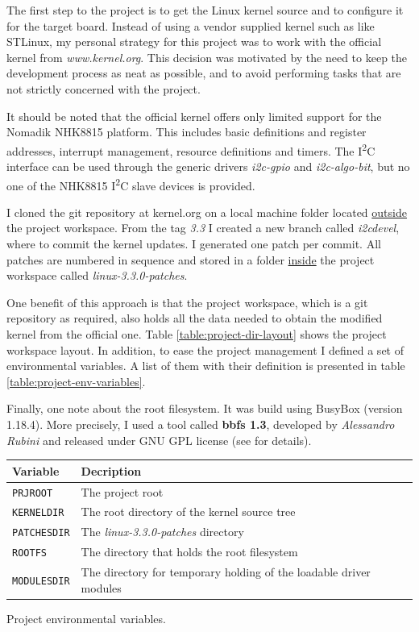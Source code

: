 \documentclass[a4paper,10pt]{article}
\makeatletter
\newenvironment{tablehere}{\def\@captype{table}}{}
\newcommand{\icc}{I\textsuperscript{2}C }
\makeatother
\begin{document}
\begin{multicols}{2}
The first step to the project is to get the Linux kernel source and to configure
it for the target board. Instead of  using a vendor supplied kernel such as like
STLinux, my personal strategy for this project was to work with the official
kernel from \emph{www.kernel.org}.
This decision was motivated by the need to keep the development process as neat
as possible, and to avoid performing tasks that are not strictly concerned with
the project.

It should be noted that the official kernel offers only limited support for the
Nomadik  NHK8815 platform.
This includes basic definitions and register addresses, interrupt management,
resource definitions and timers. The \icc interface can be used through the
generic drivers \emph{i2c-gpio} and \emph{i2c-algo-bit}, but no one of the
NHK8815 \icc slave devices is provided.

I cloned the git repository at kernel.org on a local machine folder
located \underline{outside} the project workspace. From the tag \emph{3.3}
I created a new branch called \emph{i2cdevel}, where to commit the kernel updates.
I generated one patch per commit. All patches are numbered in sequence and
stored in a folder \underline{inside} the project workspace called
\emph{linux-3.3.0-patches}.

One benefit of this approach is that the project workspace, which is a git
repository as required, also holds all the data needed to obtain the modified
kernel from the official one.
Table \ref{table:project-dir-layout} shows the project workspace layout.
In addition, to ease the project management I defined a set of environmental
variables. A list of them with their definition is presented in table
\ref{table:project-env-variables}.

Finally, one note about the root filesystem. It was build using BusyBox
(version 1.18.4). More precisely, I used a tool called \textbf{bbfs 1.3}, 
developed by \emph{Alessandro Rubini} and released under GNU GPL license
(see \cite{bbfs1.3} for details).\\

\begin{tablehere}
	\centering
	\renewcommand{\arraystretch}{1.2}	
	\begin{tabular}{l p{5.5cm}}
		\hline
		Variable & Decription \\
		\hline
		\texttt{PRJROOT} & The project root \\
		\texttt{KERNELDIR} & The root directory of the kernel source tree \\
		\texttt{PATCHESDIR} & The \emph{linux-3.3.0-patches} directory \\
		\texttt{ROOTFS} & The directory that holds the root filesystem \\
		\texttt{MODULESDIR} & The directory for temporary holding of the
			loadable driver modules \\
		\hline
	\end{tabular}
	\caption{Project environmental variables.}
	\label{table:project-env-variables}
\end{tablehere}



\end{multicols}
\end{document}
